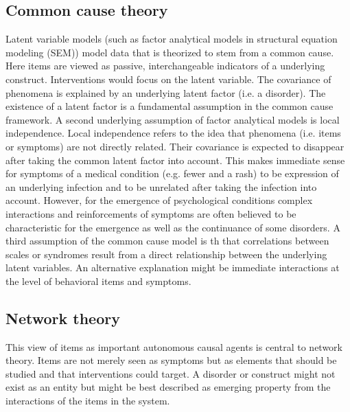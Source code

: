 \subsection{Common cause theory}
Latent variable models (such as factor analytical models in structural equation modeling (SEM)) model data that is theorized to stem from a common cause.
Here items are viewed as passive, interchangeable indicators of a underlying construct.
Interventions would focus on the latent variable.
The covariance of phenomena is explained by an underlying latent factor (i.e. a disorder).
The existence of a latent factor is a fundamental assumption in the common cause framework.
A second underlying assumption of factor analytical models is local independence. 
Local independence refers to the idea that phenomena (i.e. items or symptoms) are not directly related.
Their covariance is expected to disappear after taking the common latent factor into account.
This makes immediate sense for symptoms of a medical condition (e.g. fewer and a rash) to be expression of an underlying infection and to be unrelated after taking the infection into account. 
However, for the emergence of psychological conditions complex interactions and reinforcements of symptoms are often believed to be characteristic for the emergence as well as the continuance of some disorders.
A third assumption of the common cause model is th that correlations between scales or syndromes result from a direct relationship between the underlying latent variables. An alternative explanation might be immediate interactions at the level of behavioral items and symptoms.   

\subsection{Network theory}
This view of items as important autonomous causal agents is central to network theory.
Items are not merely seen as symptoms but as elements that should be studied and that interventions could target.
A disorder or construct might not exist as an entity but might be best described as emerging property from the interactions of the items in the system. 

%


